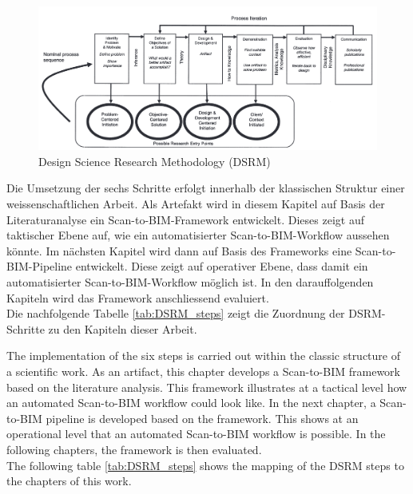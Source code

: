 \begin{figure}[h]
    \centering
    \includegraphics[width=1\textwidth]{images/DSR.png}
    \caption{Design Science Research Methodology (DSRM) \cite{peffersPDFDesignScience2024}}
    \label{fig:DSR}
\end{figure}

\begin{German}
    Die Umsetzung der sechs Schritte erfolgt innerhalb der klassischen Struktur einer weissenschaftlichen Arbeit. 
    Als Artefakt wird in diesem Kapitel auf Basis der Literaturanalyse ein Scan-to-BIM-Framework entwickelt. Dieses zeigt auf taktischer Ebene auf, wie ein automatisierter Scan-to-BIM-Workflow aussehen könnte. 
    Im nächsten Kapitel wird dann auf Basis des Frameworks eine Scan-to-BIM-Pipeline entwickelt. Diese zeigt auf operativer Ebene, dass damit ein automatisierter Scan-to-BIM-Workflow möglich ist.
    In den darauffolgenden Kapiteln wird das Framework anschliessend evaluiert.\\
    Die nachfolgende Tabelle \ref{tab:DSRM_steps} zeigt die Zuordnung der DSRM-Schritte zu den Kapiteln dieser Arbeit.
\end{German}

\begin{English}
    The implementation of the six steps is carried out within the classic structure of a scientific work. 
    As an artifact, this chapter develops a Scan-to-BIM framework based on the literature analysis. This framework illustrates at a tactical level how an automated Scan-to-BIM workflow could look like. 
    In the next chapter, a Scan-to-BIM pipeline is developed based on the framework. This shows at an operational level that an automated Scan-to-BIM workflow is possible.
    In the following chapters, the framework is then evaluated.\\
    The following table \ref{tab:DSRM_steps} shows the mapping of the DSRM steps to the chapters of this work.
\end{English}

